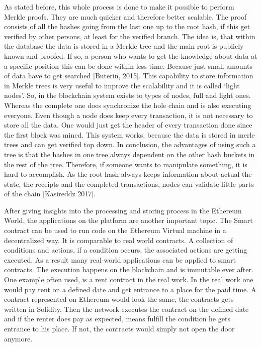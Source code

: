 As stated before, this whole process is done to make it possible to perform Merkle proofs. 
They are much quicker and therefore better scalable. 
The proof consists of all the hashes going from the last one up to the root hash, if this get verified by other persons, at least for the verified branch. 
The idea is, that within the database the data is stored in a Merkle tree and the main root is publicly known and proofed. 
If so, a person who wants to get the knowledge about data at a specific position this can be done within less time. 
Because just small amounts of data have to get searched [Buterin, 2015].
This capability to store information in Merkle trees is very useful to improve the scalability and it is called ‘light nodes’. 
So, in the blockchain system exists to types of nodes, full and light ones. 
Whereas the complete one does synchronize the hole chain and is also executing everyone. 
Even though a node does keep every transaction, it is not necessary to store all the data. 
One would just get the header of every transaction done since the first block was mined. 
This system works, because the data is stored in merle trees and can get verified top down. 
In conclusion, the advantages of using such a tree is that the hashes in one tree always dependent on the other hash buckets in the rest of the tree. 
Therefore, if someone wants to manipulate something, it is hard to accomplish. 
As the root hash always keeps information about actual the state, the receipts and the completed transactions, nodes can validate little parts of the chain [Kasireddz 2017].

After giving insights into the processing and storing process in the Ethereum World, the applications on the platform are another important topic.
The Smart contract can be used to run code on the Ethereum Virtual machine in a decentralized way. 
It is comparable to real world contracts. 
A collection of conditions and actions, if a condition occurs, the associated actions are getting executed. 
As a result many real-world applications can be applied to smart contracts. 
The execution happens on the blockchain and is immutable ever after. 
One example often used, is a rent contract in the real work. 
In the real work one would pay rent on a defined date and get entrance to a place for the paid time. A contract represented on Ethereum would look the same, the contracts gets written in Solidity. 
Then the network executes the contract on the defined date and if the renter does pay as expected, means fulfill the condition he gets entrance to his place. If not, the contracts would simply not open the door anymore. 

